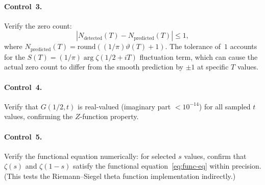 \paragraph{Control~3.}
Verify the zero count:
\begin{equation}\label{eq:control3}
  |N_{\mathrm{detected}}(T) - N_{\mathrm{predicted}}(T)| \le 1,
\end{equation}
where $N_{\mathrm{predicted}}(T) = \mathrm{round}((1/\pi)\vartheta(T) + 1)$. The
tolerance of~$1$ accounts for the $S(T) = (1/\pi)\arg\zeta(1/2 + iT)$ fluctuation term,
which can cause the actual zero count to differ from the smooth prediction by $\pm 1$ at
specific $T$ values.

\paragraph{Control~4.}
Verify that $G(1/2, t)$ is real-valued (imaginary part $< 10^{-14}$) for all sampled $t$
values, confirming the $Z$-function property.

\paragraph{Control~5.}
Verify the functional equation numerically: for selected $s$ values, confirm that
$\zeta(s)$ and $\zeta(1-s)$ satisfy the functional equation~\eqref{eq:func-eq} within
precision. (This tests the Riemann--Siegel theta function implementation indirectly.)
